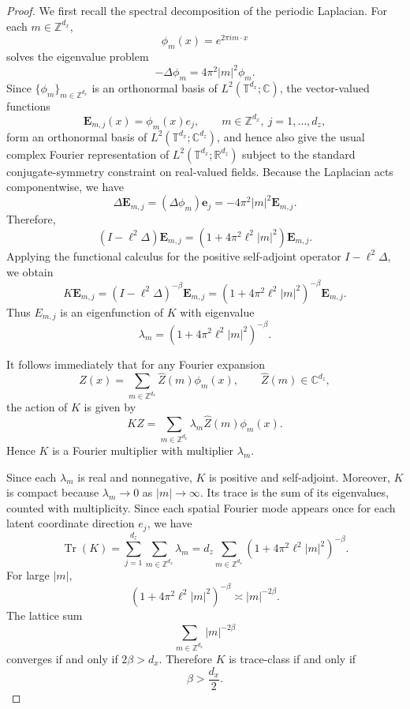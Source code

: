\documentclass[11pt]{article}
\begin{document}
\begin{proof}
We first recall the spectral decomposition of the periodic Laplacian. For each 
$m\in\mathbb Z^{d_x}$, 
\[
    \phi_m(x)=e^{2\pi i m\cdot x}
\]
solves the eigenvalue problem
\[
    -\Delta\phi_m=4\pi^2|m|^2\phi_m.
\]
Since $\{\phi_m\}_{m\in\mathbb Z^{d_x}}$ is an orthonormal basis of 
$L^2(\mathbb T^{d_x};\mathbb C)$, the vector-valued functions
\[
    \mathbf E_{m,j}(x)=\phi_m(x)e_j,
    \qquad m\in\mathbb Z^{d_x},\ j=1,\dots,d_z,
\]
form an orthonormal basis of $L^2(\mathbb T^{d_x};\mathbb C^{d_z})$, and hence also give the usual complex Fourier representation of $L^2(\mathbb T^{d_x};\mathbb R^{d_z})$ subject to the standard conjugate-symmetry constraint on real-valued fields. Because the Laplacian acts componentwise, we have
\[
    \Delta \mathbf E_{m,j}=(\Delta\phi_m)\mathbf e_j=-4\pi^2|m|^2\mathbf E_{m,j}.
\]
Therefore,
\[
    (I-\ell^2\Delta)\mathbf E_{m,j}
    =
    \left(1+4\pi^2\ell^2|m|^2\right)\mathbf E_{m,j}.
\]
Applying the functional calculus for the positive self-adjoint operator 
$I-\ell^2\Delta$, we obtain
\[
    K \mathbf E_{m,j}
    =(I-\ell^2\Delta)^{-\beta}\mathbf E_{m,j}
    =\left(1+4\pi^2\ell^2|m|^2\right)^{-\beta}\mathbf E_{m,j}.
\]
Thus $E_{m,j}$ is an eigenfunction of $K$ with eigenvalue
\[
    \lambda_m
    =
    \left(1+4\pi^2\ell^2|m|^2\right)^{-\beta}.
\]

It follows immediately that for any Fourier expansion
\[
    Z(x)
    =
    \sum_{m\in\mathbb Z^{d_x}}\widehat Z(m)\phi_m(x),
    \qquad \widehat Z(m)\in\mathbb C^{d_z},
\]
the action of $K$ is given by
\[
    KZ
    =
    \sum_{m\in\mathbb Z^{d_x}}
    \lambda_m\widehat Z(m)\phi_m(x).
\]
Hence $K$ is a Fourier multiplier with multiplier 
$\lambda_m$.

Since each $\lambda_m$ is real and nonnegative, $K$ is positive and self-adjoint. 
Moreover, $K$ is compact because $\lambda_m\to 0$ as $|m|\to\infty$. Its trace is the sum of its eigenvalues, counted with multiplicity. Since each spatial Fourier mode appears once for each latent coordinate direction $e_j$, we have
\[
    \operatorname{Tr}(K)
    =
    \sum_{j=1}^{d_z}
    \sum_{m\in\mathbb Z^{d_x}}\lambda_m
    =
    d_z
    \sum_{m\in\mathbb Z^{d_x}}
    \left(1+4\pi^2\ell^2|m|^2\right)^{-\beta}.
\]
For large $|m|$,
\[
    \left(1+4\pi^2\ell^2|m|^2\right)^{-\beta}
    \asymp
    |m|^{-2\beta}.
\]
The lattice sum
\[
    \sum_{m\in\mathbb Z^{d_x}} |m|^{-2\beta}
\]
converges if and only if $2\beta>d_x$. Therefore $K$ is trace-class if and only if
\[
    \beta>\frac{d_x}{2}.
\]


\end{proof}
\end{document}
